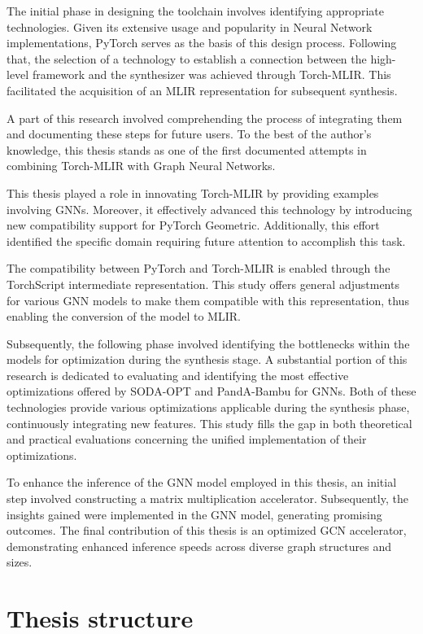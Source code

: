The initial phase in designing the toolchain involves identifying appropriate technologies.
Given its extensive usage and popularity in Neural Network implementations, PyTorch serves as the basis of this design process.
Following that, the selection of a technology to establish a connection between the high-level framework and the synthesizer was achieved through Torch-MLIR\@.
This facilitated the acquisition of an MLIR representation for subsequent synthesis.

A part of this research involved comprehending the process of integrating them and documenting these steps for future users.
To the best of the author's knowledge, this thesis stands as one of the first documented attempts in combining Torch-MLIR with Graph Neural Networks.

This thesis played a role in innovating Torch-MLIR by providing examples involving GNNs. Moreover, it effectively advanced this technology by introducing new compatibility support for PyTorch Geometric.
Additionally, this effort identified the specific domain requiring future attention to accomplish this task.

The compatibility between PyTorch and Torch-MLIR is enabled through the TorchScript intermediate representation.
This study offers general adjustments for various GNN models to make them compatible with this representation, thus enabling the conversion of the model to MLIR\@.

Subsequently, the following phase involved identifying the bottlenecks within the models for optimization during the synthesis stage.
A substantial portion of this research is dedicated to evaluating and identifying the most effective optimizations offered by SODA-OPT and PandA-Bambu for GNNs.
Both of these technologies provide various optimizations applicable during the synthesis phase, continuously integrating new features.
This study fills the gap in both theoretical and practical evaluations concerning the unified implementation of their optimizations.

To enhance the inference of the GNN model employed in this thesis, an initial step involved constructing a matrix multiplication accelerator.
Subsequently, the insights gained were implemented in the GNN model, generating promising outcomes.
The final contribution of this thesis is an optimized GCN accelerator, demonstrating enhanced inference speeds across diverse graph structures and sizes.

\section{Thesis structure}
\label{sec:thesis_structure}%

